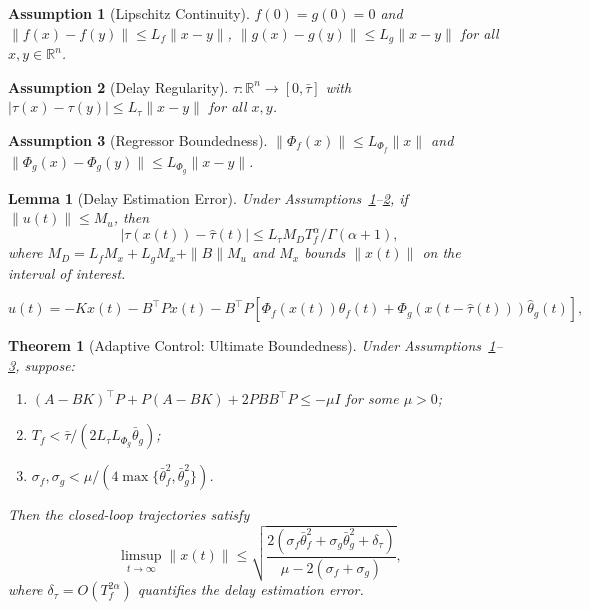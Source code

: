 \documentclass[10pt,a4paper]{amsart}
\newtheorem{assumption}{Assumption}
\newtheorem{lemma}{Lemma}
\newtheorem{theorem}{Theorem}
\begin{document}
\begin{assumption}[Lipschitz Continuity]
\label{ass:lipschitz}
$f(0) = g(0) = 0$ and $\|f(x) - f(y)\| \leq L_f \|x - y\|$, $\|g(x) - g(y)\| \leq L_g \|x - y\|$ for all $x, y \in \mathbb{R}^n$.
\end{assumption}

\begin{assumption}[Delay Regularity]
\label{ass:delay_lipschitz}
$\tau: \mathbb{R}^n \to [0, \bar{\tau}]$ with $|\tau(x) - \tau(y)| \leq L_{\tau} \|x - y\|$ for all $x, y$.
\end{assumption}

\begin{assumption}[Regressor Boundedness]
\label{ass:regressor_bound}
$\|\Phi_f(x)\| \leq L_{\Phi_f}\|x\|$ and $\|\Phi_g(x) - \Phi_g(y)\| \leq L_{\Phi_g}\|x-y\|$.
\end{assumption}

\begin{lemma}[Delay Estimation Error]
\label{lem:delay_error}
Under Assumptions~\ref{ass:lipschitz}--\ref{ass:delay_lipschitz}, if $\|u(t)\| \leq M_u$, then
\begin{equation}
|\tau(x(t)) - \hat{\tau}(t)| \leq L_{\tau} M_D T_f^{\alpha} / \Gamma(\alpha+1),
\end{equation}
where $M_D = L_f M_x + L_g M_x + \|B\|M_u$ and $M_x$ bounds $\|x(t)\|$ on the interval of interest.
\end{lemma}

\begin{equation}
\label{eq:controller}
u(t) = -K x(t) - B^{\!\top}\! P x(t) - B^{\!\top}\! P \left[ \Phi_f(x(t)) \hat{\theta}_f(t) + \Phi_g(x(t-\hat{\tau}(t))) \hat{\theta}_g(t) \right],
\end{equation}

\begin{theorem}[Adaptive Control: Ultimate Boundedness]
\label{thm:adaptive_stability}
Under Assumptions~\ref{ass:lipschitz}--\ref{ass:regressor_bound}, suppose:
\begin{enumerate}[label=\textup{(C\arabic*)}, leftmargin=2.5em]
\item $(A - BK)^{\!\top}\! P + P(A - BK) + 2PBB^{\!\top}\! P \leq -\mu I$ for some $\mu > 0$;
\item $T_f < \bar{\tau}/(2 L_{\tau} L_{\Phi_g} \bar{\theta}_g)$;
\item $\sigma_f, \sigma_g < \mu / (4 \max\{\bar{\theta}_f^2, \bar{\theta}_g^2\})$.
\end{enumerate}
Then the closed-loop trajectories satisfy
\begin{equation}
\label{eq:ultimate_bound}
\limsup_{t \to \infty} \|x(t)\| \leq \sqrt{\frac{2(\sigma_f \bar{\theta}_f^2 + \sigma_g \bar{\theta}_g^2 + \delta_{\tau})}{\mu - 2(\sigma_f + \sigma_g)}},
\end{equation}
where $\delta_{\tau} = O(T_f^{2\alpha})$ quantifies the delay estimation error.
\end{theorem}
\end{document}
